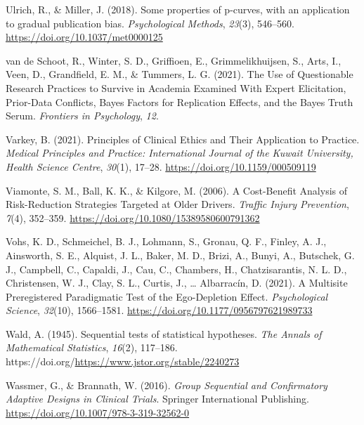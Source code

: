 \documentclass[
  letterpaper,
  DIV=11,
  numbers=noendperiod]{scrreprt}
\newlength{\cslhangindent}
\newlength{\cslentryspacingunit} %
\newenvironment{CSLReferences}[2] %
 {%
  \setlength{\parindent}{0pt}
  \ifodd #1
  \let\oldpar\par
  \def\par{\hangindent=\cslhangindent\oldpar}
  \fi
  \setlength{\parskip}{#2\cslentryspacingunit}
 }%
 {}
\begin{document}
\begin{CSLReferences}{1}{0}
\leavevmode{}%
Ulrich, R., \& Miller, J. (2018). Some properties of p-curves, with an
application to gradual publication bias. \emph{Psychological Methods},
\emph{23}(3), 546--560. \url{https://doi.org/10.1037/met0000125}

\leavevmode{}%
van de Schoot, R., Winter, S. D., Griffioen, E., Grimmelikhuijsen, S.,
Arts, I., Veen, D., Grandfield, E. M., \& Tummers, L. G. (2021). The
{Use} of {Questionable Research Practices} to {Survive} in {Academia
Examined With Expert Elicitation}, {Prior-Data Conflicts}, {Bayes
Factors} for {Replication Effects}, and the {Bayes Truth Serum}.
\emph{Frontiers in Psychology}, \emph{12}.

\leavevmode{}%
Varkey, B. (2021). Principles of {Clinical Ethics} and {Their
Application} to {Practice}. \emph{Medical Principles and Practice:
International Journal of the Kuwait University, Health Science Centre},
\emph{30}(1), 17--28. \url{https://doi.org/10.1159/000509119}

\leavevmode{}%
Viamonte, S. M., Ball, K. K., \& Kilgore, M. (2006). A {Cost-Benefit
Analysis} of {Risk-Reduction Strategies Targeted} at {Older Drivers}.
\emph{Traffic Injury Prevention}, \emph{7}(4), 352--359.
\url{https://doi.org/10.1080/15389580600791362}

\leavevmode{}%
Vohs, K. D., Schmeichel, B. J., Lohmann, S., Gronau, Q. F., Finley, A.
J., Ainsworth, S. E., Alquist, J. L., Baker, M. D., Brizi, A., Bunyi,
A., Butschek, G. J., Campbell, C., Capaldi, J., Cau, C., Chambers, H.,
Chatzisarantis, N. L. D., Christensen, W. J., Clay, S. L., Curtis, J.,
\ldots{} Albarracín, D. (2021). A {Multisite Preregistered Paradigmatic
Test} of the {Ego-Depletion Effect}. \emph{Psychological Science},
\emph{32}(10), 1566--1581.
\url{https://doi.org/10.1177/0956797621989733}

\leavevmode{}%
Wald, A. (1945). Sequential tests of statistical hypotheses. \emph{The
Annals of Mathematical Statistics}, \emph{16}(2), 117--186.
https://doi.org/\url{https://www.jstor.org/stable/2240273}

\leavevmode{}%
Wassmer, G., \& Brannath, W. (2016). \emph{Group {Sequential} and
{Confirmatory Adaptive Designs} in {Clinical Trials}}. {Springer
International Publishing}.
\url{https://doi.org/10.1007/978-3-319-32562-0}


\end{CSLReferences}
\end{document}
